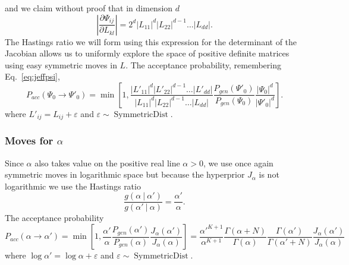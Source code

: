 \documentclass[11pt, oneside]{article}   	%
\begin{document}
and we claim without proof that in dimension $d$
$$\left\vert\frac{\partial\Psi_{ij}}{\partial L_{kl}}\right\vert = 2^d \vert L_{11}\vert^d \vert L_{22}\vert^{d-1}\ldots \vert L_{dd}\vert.$$
The Hastings ratio we will form using this expression for the determinant of the Jacobian allows us to uniformly explore the space of positive definite matrices using easy symmetric moves in $L$. The acceptance probability, remembering Eq.~\ref{eq:jeffpsi},
$$P_{acc}(\Psi_0\rightarrow\Psi'_0) = \min\left[1, \frac{\vert L'_{11}\vert^d \vert L'_{22}\vert^{d-1}\ldots \vert L'_{dd}\vert}{\vert L_{11}\vert^d \vert L_{22}\vert^{d-1}\ldots \vert L_{dd}\vert}\frac{P_{gen}(\Psi'_0)}{P_{gen}(\Psi_0)}\frac{\vert\Psi_0\vert^d}{\vert\Psi'_0\vert^d}\right].$$
where $L'_{ij} = L_{ij} + \varepsilon$ and $\varepsilon\sim\operatorname{SymmetricDist}$.

\subsubsection{Moves for $\alpha$}
Since $\alpha$ also takes value on the positive real line $\alpha > 0$, we use once again symmetric moves in logarithmic space but because the hyperprior $J_\alpha$ is not logarithmic we use the Hastings ratio
$$\frac{g(\alpha~\vert~\alpha')}{g(\alpha'~\vert~\alpha)} = \frac{\alpha'}{\alpha}.$$
The acceptance probability
$$P_{acc}(\alpha\rightarrow\alpha') = \min\left[1, \frac{\alpha'}{\alpha}\frac{P_{gen}(\alpha')}{P_{gen}(\alpha)}\frac{J_{\alpha}(\alpha')}{J_\alpha(\alpha)}\right] = \frac{\alpha'^{K+1}}{\alpha^{K+1}}\frac{\Gamma(\alpha + N)}{\Gamma(\alpha)}\frac{\Gamma(\alpha')}{\Gamma(\alpha' + N)}\frac{J_\alpha(\alpha')}{J_\alpha(\alpha)}$$
where $\log\alpha' = \log\alpha + \varepsilon$ and $\varepsilon\sim\operatorname{SymmetricDist}$.
\end{document}

